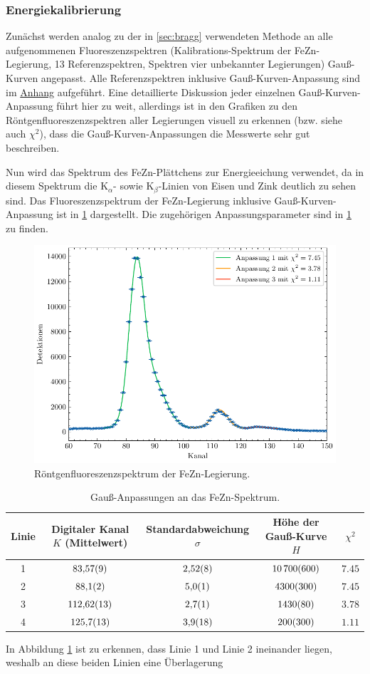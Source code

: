 \subsubsection*{Energiekalibrierung}\label{subsubsec:energie_kali}
Zunächst werden analog zu der in \cref{sec:bragg} verwendeten Methode an alle aufgenommenen Fluoreszenzspektren (Kalibrations-Spektrum der FeZn-Legierung, 13 Referenzspektren, Spektren vier unbekannter Legierungen)
Gauß-Kurven angepasst. Alle Referenzspektren inklusive Gauß-Kurven-Anpassung sind im \hyperref[sec:anhang]{Anhang} aufgeführt. Eine detaillierte Diskussion
jeder einzelnen Gauß-Kurven-Anpassung führt hier zu weit, allerdings ist in den Grafiken zu den Röntgenfluoreszenzspektren aller Legierungen visuell zu erkennen (bzw. siehe auch $\chi^2$), dass die Gauß-Kurven-Anpassungen
die Messwerte sehr gut beschreiben.\par
Nun wird das Spektrum des FeZn-Plättchens zur Energieeichung verwendet, da in diesem Spektrum die $\mathrm{K}_{\alpha}$- sowie $\mathrm{K}_{\beta}$-Linien
von Eisen und Zink deutlich zu sehen sind. Das Fluoreszenzspektrum der FeZn-Legierung inklusive Gauß-Kurven-Anpassung ist in \cref{fig:fezn} dargestellt.
Die zugehörigen Anpassungsparameter sind in \cref{tab:fezn-gauss-fits} zu finden.
\begin{figure}[H]
	\centering
	\includegraphics[width=0.6\linewidth]{../figs/FeZn.pdf}
	\caption{Röntgenfluoreszenzspektrum der FeZn-Legierung.}
	\label{fig:fezn}
\end{figure}
\begin{table}[H]
    \centering
 \caption{Gauß-Anpassungen an das FeZn-Spektrum.}
 \begin{tabular}{c c c c c}
 \hline Linie & Digitaler Kanal $K$ (Mittelwert) & Standardabweichung $\sigma$ & Höhe der Gauß-Kurve $H$ & $\chi^2$ \\ 
 \hline
 1 & $\num{83.57\pm 0.09}$ & $\num{2.52\pm 0.08}$ & $\num{10700\pm 600}$ & $\num{7.45}$ \\
 2 & $\num{88.1\pm 0.2}$ & $\num{5.0\pm 0.1}$ & $\num{4300\pm 300}$ & $\num{7.45}$ \\
 3 & $\num{112.62\pm 0.13}$ & $\num{2.7\pm 0.1}$ & $\num{1430\pm 80}$ & $\num{3.78}$ \\
 4 & $\num{125.7\pm 1.3}$ & $\num{3.9\pm 1.8}$ & $\num{200\pm 300}$ & $\num{1.11}$ \\
 \hline\end{tabular}
 \label{tab:fezn-gauss-fits}
\end{table} In Abbildung \cref{fig:fezn} ist zu erkennen, dass Linie 1 und Linie 2 ineinander liegen, weshalb an diese beiden Linien eine Überlagerung
